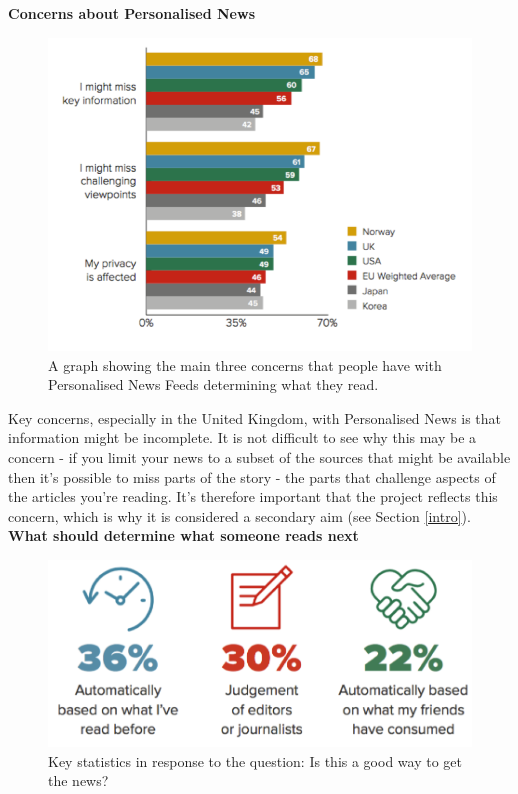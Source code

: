 \documentclass[12pt]{article}
\begin{document}
\textbf{Concerns about Personalised News}

\begin{figure}[h]
  \centering
    \includegraphics[scale=0.6]{PersonalisedNewsConcerns.png}
   \caption[Concerns with personalisation of News Feeds]{A graph showing the main three concerns that people have with Personalised News Feeds determining what they read.}
   \label{PersonalisedNewsConcerns}
\end{figure}

Key concerns, especially in the United Kingdom, with Personalised News is that information might be incomplete. It is not difficult to see why this may be a concern - if you limit your news to a subset of the sources that might be available then it's possible to miss parts of the story - the parts that challenge aspects of the articles you're reading. It's therefore important that the project reflects this concern, which is why it is considered a secondary aim (see Section \ref{intro}). \\

\textbf{What should determine what someone reads next}

\begin{figure}[h]
  \centering
    \includegraphics[scale=0.6]{HowPeopleTrustNews.png}
   \caption[What is a good way to get to the news?]{Key statistics in response to the question: Is this a good way to get the news?}
   \label{HowPeopleTrustNews}
\end{figure}
\end{document}
